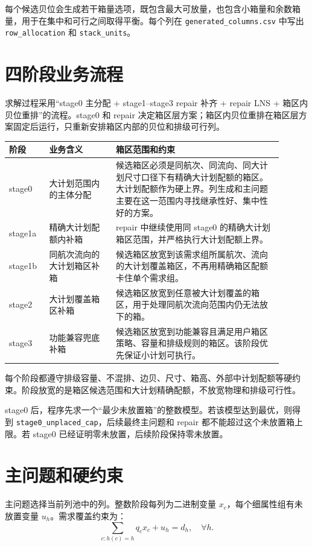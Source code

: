 \documentclass[UTF8,a4paper,11pt]{ctexart}
\newcommand{\code}[1]{\nolinkurl{#1}}
\begin{document}
每个候选贝位会生成若干箱量选项，既包含最大可放量，也包含小箱量和余数箱量，用于在集中和可行之间取得平衡。每个列在 \code{generated_columns.csv} 中写出 \code{row_allocation} 和 \code{stack_units}。

\section{四阶段业务流程}

求解过程采用“stage0 主分配 + stage1--stage3 repair 补齐 + repair LNS + 箱区内贝位重排”的流程。stage0 和 repair 决定箱区层方案；箱区内贝位重排在箱区层方案固定后运行，只重新安排箱区内部的贝位和排级可行列。

\begin{longtable}{L{0.13\linewidth}L{0.22\linewidth}L{0.55\linewidth}}
\toprule
阶段 & 业务含义 & 箱区范围和约束\\
\midrule
\endhead
stage0 & 大计划范围内的主体分配 & 候选箱区必须是同航次、同流向、同大计划尺寸口径下有精确大计划配额的箱区。大计划配额作为硬上界。列生成和主问题主要在这一范围内寻找继承性好、集中性好的方案。\\
stage1a & 精确大计划配额内补箱 & repair 中继续使用同 stage0 的精确大计划箱区范围，并严格执行大计划配额上界。\\
stage1b & 同航次流向的大计划箱区补箱 & 候选箱区放宽到该需求组所属航次、流向的大计划覆盖箱区，不再用精确箱区配额卡住单个需求组。\\
stage2 & 大计划覆盖箱区补箱 & 候选箱区放宽到任意被大计划覆盖的箱区，用于处理同航次流向范围内仍无法放下的箱。\\
stage3 & 功能兼容兜底补箱 & 候选箱区放宽到功能兼容且满足用户箱区策略、容量和排级规则的箱区。该阶段优先保证小计划可执行。\\
\bottomrule
\end{longtable}

每个阶段都遵守排级容量、不混排、边贝、尺寸、箱高、外部中计划配额等硬约束。阶段放宽的是箱区候选范围和大计划精确配额，不放宽物理和排级可行性。

stage0 后，程序先求一个“最少未放置箱”的整数模型。若该模型达到最优，则得到 \code{stage0_unplaced_cap}，后续最终主问题和 repair 都不能超过这个未放置箱上限。若 stage0 已经证明零未放置，后续阶段保持零未放置。

\section{主问题和硬约束}

主问题选择当前列池中的列。整数阶段每列为二进制变量 \(x_c\)，每个细属性组有未放置变量 \(u_h\)。需求覆盖约束为：
\[
\sum_{c:h(c)=h} q_cx_c+u_h=d_h,\quad \forall h.
\]
\end{document}
